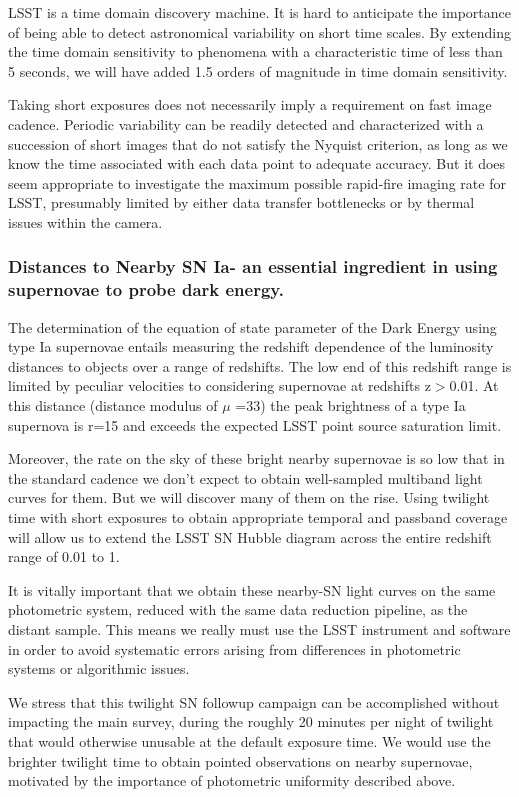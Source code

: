 LSST is a time domain discovery machine. It is hard to anticipate the
importance of being able to detect astronomical variability on short
time scales. By extending the time domain sensitivity to phenomena with
a characteristic time of less than 5 seconds, we will have added 1.5
orders of magnitude in time domain sensitivity.

Taking short exposures does not necessarily imply a requirement on fast
image cadence. Periodic variability can be readily detected and
characterized with a succession of short images that do not satisfy the
Nyquist criterion, as long as we know the time associated with each data
point to adequate accuracy. But it does seem appropriate to investigate
the maximum possible rapid-fire imaging rate for LSST, presumably
limited by either data transfer bottlenecks or by thermal issues within
the camera.

\subsubsection{Distances to Nearby SN Ia- an essential ingredient in using supernovae to probe dark energy.}

The determination of the equation of state parameter of the Dark Energy
using type Ia supernovae entails measuring the redshift dependence of
the luminosity distances to objects over a range of redshifts. The low
end of this redshift range is limited by peculiar velocities to
considering supernovae at redshifts z$>$0.01. At this distance (distance
modulus of $\mu$ =33) the peak brightness of a type Ia supernova is r=15
and exceeds the expected LSST point source saturation limit.

Moreover, the rate on the sky of these bright nearby supernovae is so
low that in the standard cadence we don't expect to obtain well-sampled
multiband light curves for them. But we will discover many of them on
the rise. Using twilight time with short exposures to obtain appropriate
temporal and passband coverage will allow us to extend the LSST SN
Hubble diagram across the entire redshift range of 0.01 to 1.

It is vitally important that we obtain these nearby-SN light curves on
the same photometric system, reduced with the same data reduction
pipeline, as the distant sample. This means we really must use the LSST
instrument and software in order to avoid systematic errors arising from
differences in photometric systems or algorithmic issues.

We stress that this twilight SN followup campaign can be accomplished
without impacting the main survey, during the roughly 20 minutes per
night of twilight that would otherwise unusable at the default exposure
time. We would use the brighter twilight time to obtain pointed
observations on nearby supernovae, motivated by the importance of
photometric uniformity described above.


